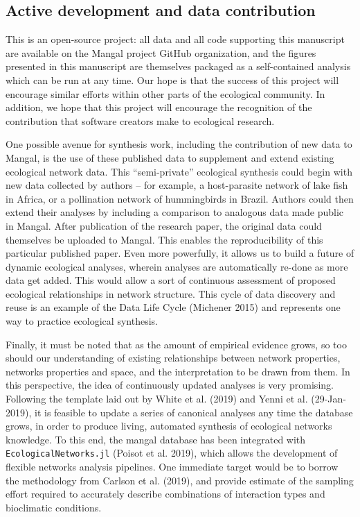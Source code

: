 \hypertarget{active-development-and-data-contribution}{%
\subsection{Active development and data
contribution}\label{active-development-and-data-contribution}}

This is an open-source project: all data and all code supporting this
manuscript are available on the Mangal project GitHub organization, and
the figures presented in this manuscript are themselves packaged as a
self-contained analysis which can be run at any time. Our hope is that
the success of this project will encourage similar efforts within other
parts of the ecological community. In addition, we hope that this
project will encourage the recognition of the contribution that software
creators make to ecological research.

One possible avenue for synthesis work, including the contribution of
new data to Mangal, is the use of these published data to supplement and
extend existing ecological network data. This ``semi-private''
ecological synthesis could begin with new data collected by authors --
for example, a host-parasite network of lake fish in Africa, or a
pollination network of hummingbirds in Brazil. Authors could then extend
their analyses by including a comparison to analogous data made public
in Mangal. After publication of the research paper, the original data
could themselves be uploaded to Mangal. This enables the reproducibility
of this particular published paper. Even more powerfully, it allows us
to build a future of dynamic ecological analyses, wherein analyses are
automatically re-done as more data get added. This would allow a sort of
continuous assessment of proposed ecological relationships in network
structure. This cycle of data discovery and reuse is an example of the
Data Life Cycle (Michener 2015) and represents one way to practice
ecological synthesis.

Finally, it must be noted that as the amount of empirical evidence
grows, so too should our understanding of existing relationships between
network properties, networks properties and space, and the
interpretation to be drawn from them. In this perspective, the idea of
continuously updated analyses is very promising. Following the template
laid out by White et al. (2019) and Yenni et al. (29-Jan-2019), it is
feasible to update a series of canonical analyses any time the database
grows, in order to produce living, automated synthesis of ecological
networks knowledge. To this end, the mangal database has been integrated
with \texttt{EcologicalNetworks.jl} (Poisot et al. 2019), which allows
the development of flexible networks analysis pipelines. One immediate
target would be to borrow the methodology from Carlson et al. (2019),
and provide estimate of the sampling effort required to accurately
describe combinations of interaction types and bioclimatic conditions.

